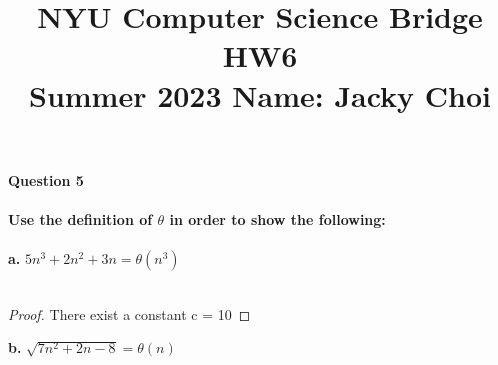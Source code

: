 \documentclass{article}
\title{\textbf{NYU Computer Science Bridge HW6}\\
Summer 2023 Name: Jacky Choi}
\date{}
\begin{document}
\setul{}{2pt}
\maketitle

\noindent \textbf{Question 5}\\\\
\textbf{Use the definition of $\theta$ in order to show the following: }\\\\
\textbf{a.}
$5n^3 + 2n^2 + 3n = \theta (n^3)$\\\\
\begin{proof}
There exist a constant c = 10
\end{proof}
\noindent \textbf{b.}
$\sqrt{7n^2 + 2n - 8} = \theta (n)$\\\\
\end{document}
